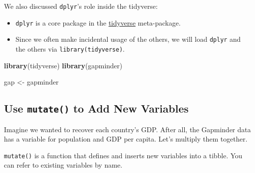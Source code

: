 \documentclass[
]{book}
\newenvironment{Shaded}{\begin{snugshade}}{\end{snugshade}}
\newcommand{\CommentTok}[1]{\textcolor[rgb]{0.56,0.35,0.01}{\textit{#1}}}
\newcommand{\DataTypeTok}[1]{\textcolor[rgb]{0.13,0.29,0.53}{#1}}
\newcommand{\KeywordTok}[1]{\textcolor[rgb]{0.13,0.29,0.53}{\textbf{#1}}}
\newcommand{\NormalTok}[1]{#1}
\newcommand{\OperatorTok}[1]{\textcolor[rgb]{0.81,0.36,0.00}{\textbf{#1}}}
\newcommand{\StringTok}[1]{\textcolor[rgb]{0.31,0.60,0.02}{#1}}
\providecommand{\tightlist}{%
  \setlength{\itemsep}{0pt}\setlength{\parskip}{0pt}}
\begin{document}
We also discussed \texttt{dplyr}'s role inside the tidyverse:

\begin{itemize}
\tightlist
\item
  \texttt{dplyr} is a core package in the \href{tidyverse-github}{tidyverse} meta-package.
\item
  Since we often make incidental usage of the others, we will load \texttt{dplyr} and the others via \texttt{library(tidyverse)}.
\end{itemize}

\begin{Shaded}
\begin{Highlighting}[]
\KeywordTok{library}\NormalTok{(tidyverse)}
\KeywordTok{library}\NormalTok{(gapminder)}

\NormalTok{gap <-}\StringTok{ }\NormalTok{gapminder}
\end{Highlighting}
\end{Shaded}

\hypertarget{use-mutate-to-add-new-variables}{%
\subsection{\texorpdfstring{Use \texttt{mutate()} to Add New Variables}{Use mutate() to Add New Variables}}\label{use-mutate-to-add-new-variables}}

Imagine we wanted to recover each country's GDP. After all, the Gapminder data has a variable for population and GDP per capita. Let's multiply them together.

\texttt{mutate()} is a function that defines and inserts new variables into a tibble. You can refer to existing variables by name.

\begin{Shaded}
\end{Shaded}
\end{document}
